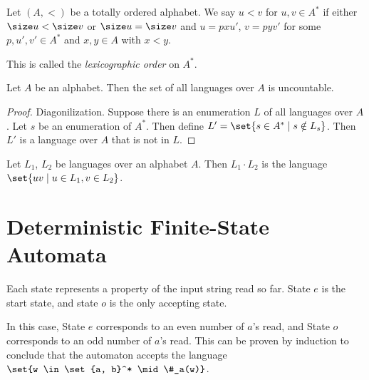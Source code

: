 \begin{definition} \label{def:languages:lexicographic}
    Let $(A, <)$ be a totally ordered alphabet.
    We say $u < v$ for $u, v \in A^*$ if either $\size u < \size v$ or
    $\size u = \size v$ and $u = pxu'$, $v = pyv'$ for some $p, u', v' \in A^*$
    and $x, y \in A$ with $x < y$.

    This is called the \emph{lexicographic order} on $A^*$.
\end{definition}

\begin{proposition}
    Let $A$ be an alphabet.
    Then the set of all languages over $A$ is uncountable.
\end{proposition}
\begin{proof}
    Diagonilization.
    Suppose there is an enumeration $L$ of all languages over $A$.
    Let $s$ be an enumeration of $A^*$.
    Then define $L' = \set{s \in A^* \mid s \notin L_s}$.
    Then $L'$ is a language over $A$ that is not in $L$.
\end{proof}

\begin{definition}[Concatenations] \label{def:languages:concatenations}
    Let $L_1$, $L_2$ be languages over an alphabet $A$.
    Then $L_1 \cdot L_2$ is the language $\set{uv \mid u \in L_1, v \in L_2}$.
\end{definition}

\section{Deterministic Finite-State Automata} \label{sec:dfa}
\begin{center}
\end{center}
Each state represents a property of the input string read so far.
State $e$ is the start state, and state $o$ is the only accepting state.

In this case, State $e$ corresponds to an even number of $a$'s read,
and State $o$ corresponds to an odd number of $a$'s read.
This can be proven by induction to conclude that the automaton accepts the
language $\set{w \in \set{a, b}^* \mid \#_a(w)}$.

